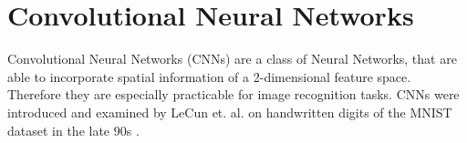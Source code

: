 \section{Convolutional Neural Networks}
Convolutional Neural Networks (CNNs) are a class of Neural Networks, that are able to incorporate spatial information of a 2-dimensional feature space. Therefore they are especially practicable for image recognition tasks. 
CNNs were introduced and examined by LeCun et. al. on handwritten digits of the MNIST dataset in the late 90s
\cite{LeCun1998}.
